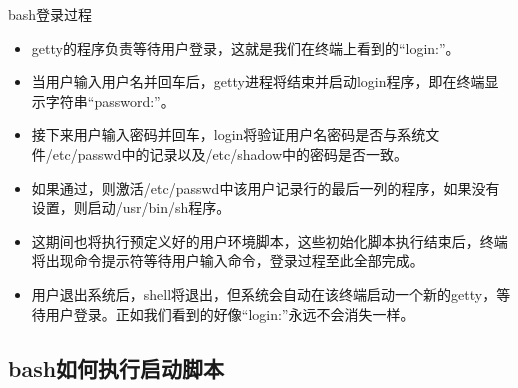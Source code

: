 \begin{frame}[allowframebreaks]{bash登录过程}
\begin{itemize}
\item getty的程序负责等待用户登录，这就是我们在终端上看到的“login:”。 

\item  当用户输入用户名并回车后，getty进程将结束并启动login程序，即在终端显示字符串“password:”。

\item 接下来用户输入密码并回车，login将验证用户名密码是否与系统文件/etc/passwd中的记录以及/etc/shadow中的密码是否一致。 

\item 如果通过，则激活/etc/passwd中该用户记录行的最后一列的程序，如果没有设置，则启动/usr/bin/sh程序。

\item 这期间也将执行预定义好的用户环境脚本，这些初始化脚本执行结束后，终端将出现命令提示符等待用户输入命令，登录过程至此全部完成。 

\item 用户退出系统后，shell将退出，但系统会自动在该终端启动一个新的getty，等待用户登录。正如我们看到的好像“login:”永远不会消失一样。
\end{itemize}
\end{frame}

\subsection{bash如何执行启动脚本}

